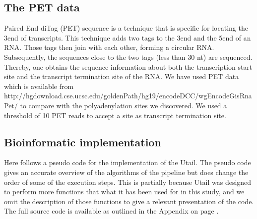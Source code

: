 \subsection{The PET data}
Paired End diTag (PET) sequence is a technique that is specific for locating
the 3\ppp end of transcripts. This technique adds two tags to the 3\ppp end and
the 5\ppp end of an RNA. Those tags then join with each other, forming a
circular RNA. Subsequently, the sequences close to the two tags (less than 30
nt) are sequenced. Thereby, one obtains the sequence information about both the
transcription start site and the transcript termination site of the RNA. We
have used PET data which is available from
http://hgdownload.cse.ucsc.edu/goldenPath/hg19/encodeDCC/wgEncodeGisRnaPet/ to
compare with the polyadenylation sites we discovered. We used a threshold of 10
PET reads to accept a site as transcript termination site.

\subsection{Bioinformatic implementation}
Here follows a pseudo code for the implementation of the Utail. The pseudo
code gives an accurate overview of the algorithms of the pipeline but does
change the order of some of the execution steps. This is partially because
Utail was designed to perform more functions that what it has been used for in
this study, and we omit the description of those functions to give a relevant
presentation of the code. The full source code is available as outlined in the
Appendix on page \pageref{source_code}.

\inputminted[fontsize=\small]{python}{pseudo_code/utail.py}


